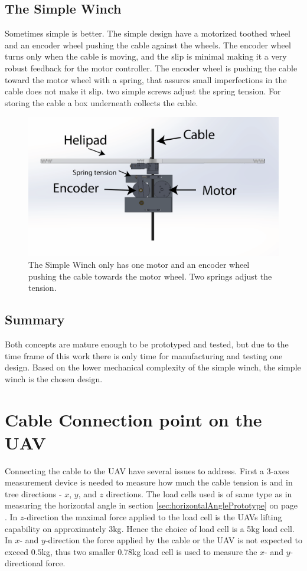 \subsection{The Simple Winch}
Sometimes simple is better. The simple design have a motorized toothed wheel and an encoder wheel pushing the cable against the wheels. The encoder wheel turns only when the cable is moving, and the slip is minimal making it a very robust feedback for the motor controller. The encoder wheel is pushing the cable toward the motor wheel with a spring, that assures small imperfections in the cable does not make it slip. two simple screws adjust the spring tension. For storing the cable a box underneath collects the cable.

\begin{figure}[H]
\centering
\includegraphics[scale=0.75]{graphics/cad/winch.png}
\caption[The Simple Winch]{The Simple Winch only has one motor and an encoder wheel pushing the cable towards the motor wheel. Two springs adjust the tension.}
\label{fig:winch}
\end{figure}

\subsection{Summary}
Both concepts are mature enough to be prototyped and tested, but due to the time frame of this work there is only time for manufacturing and testing one design. Based on the lower mechanical complexity of the simple winch, the simple winch is the chosen design.    


\section{Cable Connection point on the UAV}
Connecting the cable to the UAV have several issues to address. First a 3-axes measurement device is needed to measure how much the cable tension is and in tree directions - $x$, $y$, and $z$ directions. The load cells used is of same type as in measuring the horizontal angle in section \ref{sec:horizontalAnglePrototype} on page \pageref{sec:horizontalAnglePrototype}. In $z$-direction the maximal force applied to the load cell is the UAVs lifting capability on approximately 3kg\cite{Sidea2013}. Hence the choice of load cell is a 5kg load cell.\\
\noindent
In $x$- and $y$-direction the force applied by the cable or the UAV is not expected to exceed $0.5$kg, thus two smaller $0.78$kg load cell is used to measure the $x$- and $y$-directional force. 

